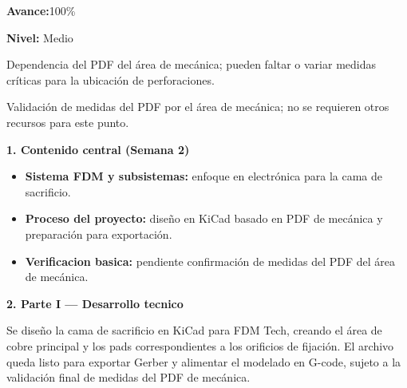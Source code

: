 \documentclass[11pt,a4paper]{article}
\newcommand{\AvancePorcentaje}{100\%}
\newcommand{\RiesgoNivel}{Medio}
\newcommand{\RiesgosDetalle}{Dependencia del PDF del \'area de mec\'anica; pueden faltar o variar medidas cr\'iticas para la ubicaci\'on de perforaciones.}
\newcommand{\RecursosNecesarios}{Validaci\'on de medidas del PDF por el \'area de mec\'anica; no se requieren otros recursos para este punto.}
\newif\ifShowNextSteps      \ShowNextStepsfalse
\newcommand{\ProximoPasoUno}{No aplica.}
\newcommand{\ProximoPasoDos}{No aplica.}
\newcommand{\ProximoPasoTres}{No aplica.}
\newcommand{\Field}[2]{\textbf{\color{FDMdark}#1}\hspace{4pt}{\color{FDMgray}#2}}
\newcommand{\SectionTitle}[1]{%
  \vspace{1mm}
  {\Large\bfseries\color{FDMblue}#1}\par
  \vspace{1mm}
}
\newcommand{\SafeItem}{\Needspace{3\baselineskip}\item}
\begin{document}
\clearpage

\begin{tcolorbox}[title=\textbf{\color{FDMblue}Avance de hito}]
\Field{Avance:}{ }\AvancePorcentaje
\end{tcolorbox}

\begin{tcolorbox}[title=\textbf{\color{FDMblue}Riesgos y dependencias}]\textbf{Nivel:} \RiesgoNivel\par
{\color{FDMgray}\RiesgosDetalle}
\end{tcolorbox}

\begin{tcolorbox}[title=\textbf{\color{FDMblue}Recursos necesarios}]
{\color{FDMgray}\RecursosNecesarios}
\end{tcolorbox}

\ifShowNextSteps
\begin{tcolorbox}[title=\textbf{\color{FDMblue}Proximos pasos (opcional)}]
\begin{itemize}[leftmargin=*,itemsep=2pt]
  \SafeItem \ProximoPasoUno
  \SafeItem \ProximoPasoDos
  \SafeItem \ProximoPasoTres
\end{itemize}
\end{tcolorbox}
\fi

\newpage

\SectionTitle{1. Contenido central (Semana 2)}
\begin{tcolorbox}
\begin{itemize}[leftmargin=*,itemsep=3pt]
  \SafeItem \textbf{Sistema FDM y subsistemas:} enfoque en electr\'onica para la cama de sacrificio.
  \SafeItem \textbf{Proceso del proyecto:} dise\~no en KiCad basado en PDF de mec\'anica y preparaci\'on para exportaci\'on.
  \SafeItem \textbf{Verificacion basica:} pendiente confirmaci\'on de medidas del PDF del \'area de mec\'anica.
\end{itemize}
\end{tcolorbox}

\SectionTitle{2. Parte I — Desarrollo tecnico}
\begin{tcolorbox}[colback=FDMsoft2,title=\textbf{\color{FDMblue}Resumen tecnico}]
{\color{FDMgray}
Se dise\~no la cama de sacrificio en KiCad para FDM Tech, creando el \'area de cobre
principal y los pads correspondientes a los orificios de fijaci\'on. El archivo queda listo
para exportar Gerber y alimentar el modelado en G-code, sujeto a la validaci\'on final
de medidas del PDF de mec\'anica.
}
\end{tcolorbox}
\end{document}
